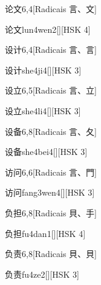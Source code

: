 \begin{entry}{论文}{6,4}[Radicais ⾔、⽂]
  \begin{phonetics}{论文}{lun4wen2}[][HSK 4]
  \end{phonetics}
\end{entry}

\begin{entry}{设计}{6,4}[Radicais ⾔、⾔]
  \begin{phonetics}{设计}{she4ji4}[][HSK 3]
  \end{phonetics}
\end{entry}

\begin{entry}{设立}{6,5}[Radicais ⾔、⽴]
  \begin{phonetics}{设立}{she4li4}[][HSK 3]
  \end{phonetics}
\end{entry}

\begin{entry}{设备}{6,8}[Radicais ⾔、⼡]
  \begin{phonetics}{设备}{she4bei4}[][HSK 3]
  \end{phonetics}
\end{entry}

\begin{entry}{访问}{6,6}[Radicais ⾔、⾨]
  \begin{phonetics}{访问}{fang3wen4}[][HSK 3]
  \end{phonetics}
\end{entry}

\begin{entry}{负担}{6,8}[Radicais ⾙、⼿]
  \begin{phonetics}{负担}{fu4dan1}[][HSK 4]
  \end{phonetics}
\end{entry}

\begin{entry}{负责}{6,8}[Radicais ⾙、⾙]
  \begin{phonetics}{负责}{fu4ze2}[][HSK 3]
  \end{phonetics}
\end{entry}

